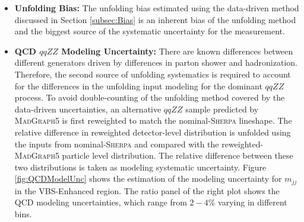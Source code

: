 \begin{itemize}
    \item{\textbf{Unfolding Bias:} The unfolding bias estimated using the data-driven method discussed in Section \ref{subsec:Bias} is an inherent bias of the unfolding method and the biggest source of the systematic uncertainty for the measurement.
    }

    \item{\textbf{QCD $qqZZ$ Modeling Uncertainty:} There are known differences between different generators driven by differences in parton shower and hadronization. Therefore, the second source of unfolding systematics is required to account for the differences in the unfolding input modeling for the dominant $qqZZ$ process. To avoid double-counting of the unfolding method covered by the data-driven uncertainties, an alternative $qqZZ$ sample predicted by \textsc{MadGraph5} is first reweighted to match the nominal-\textsc{Sherpa} lineshape. The relative difference in reweighted detector-level distribution is unfolded using the inputs from nominal-\textsc{Sherpa} and compared with the reweighted-\textsc{MadGraph5} particle level distribution. The relative difference between these two distributions is taken as modeling systematic uncertainty. Figure \ref{fig:QCDModelUnc} shows the estimation of the modeling uncertainty for $m_{jj}$ in the VBS-Enhanced region. The ratio panel of the right plot shows the QCD modeling uncertainties, which range from $2-4\%$ varying in different bins.
    
}
\end{itemize}
